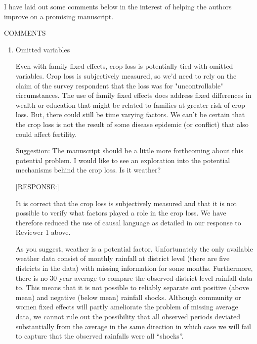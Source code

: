 \documentclass[letterpaper,12pt]{article}
\begin{document}
I have laid out some comments below in the interest of helping the
authors improve on a promising manuscript.


COMMENTS

\begin{enumerate}

\item Omitted variables

Even with family fixed effects, crop loss is potentially tied with
omitted variables. Crop loss is subjectively measured, so we'd need to
rely on the claim of the survey respondent that the loss was for
"uncontrollable" circumstances. The use of family fixed effects does
address fixed differences in wealth or education that might be related
to families at greater risk of crop loss. But, there could still be time
varying factors. We can't be certain that the crop loss is not the
result of some disease epidemic (or conflict) that also could affect
fertility.

Suggestion: The manuscript should be a little more forthcoming about
this potential problem. I would like to see an exploration into the
potential mechanisms behind the crop loss. Is it weather?

[RESPONSE:]

% 

It is correct that the crop loss is subjectively measured and that
it is not possible to verify what factors played a role in the crop loss.
We have therefore reduced the use of causal language as detailed in our
response to Reviewer 1 above.

As you suggest, weather is a potential factor.
Unfortunately the only available weather data consist of monthly rainfall 
at district level (there are five districts in the data) with missing 
information for some months.
Furthermore, there is no 30 year average to compare the observed 
district level rainfall data to.
This means that it is not possible to reliably separate out positive 
(above mean) and negative (below mean) rainfall shocks.
Although community or women fixed effects will partly ameliorate the
problem of missing average data, we cannot rule out the possibility
that all observed periods deviated substantially from the average in 
the same direction in which case we will fail to capture that the observed
rainfalls were all ``shocks''.


\end{enumerate}
\end{document}
